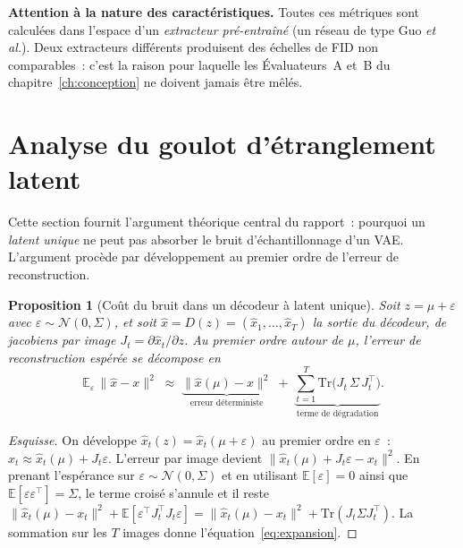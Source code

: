 \documentclass[12pt,a4paper,oneside]{report}
\theoremstyle{definition}
\theoremstyle{plain}
\newtheorem{proposition}{Proposition}[chapter]
\newcommand{\E}{\mathbb{E}}
\newcommand{\Ncal}{\mathcal{N}}
\begin{document}
\begin{encadre}
\textbf{Attention à la nature des caractéristiques.} Toutes ces métriques sont
calculées dans l'espace d'un \emph{extracteur pré-entraîné} (un réseau de type Guo
\emph{et al.}). Deux extracteurs différents produisent des échelles de FID non
comparables~: c'est la raison pour laquelle les Évaluateurs~A et~B du
chapitre~\ref{ch:conception} ne doivent jamais être mêlés.
\end{encadre}

\section{Analyse du goulot d'étranglement latent}
\label{sec:goulot}

Cette section fournit l'argument théorique central du rapport~: pourquoi un
\emph{latent unique} ne peut pas absorber le bruit d'échantillonnage d'un VAE.
L'argument procède par développement au premier ordre de l'erreur de
reconstruction.

\begin{proposition}[Coût du bruit dans un décodeur à latent unique]
\label{prop:jacobien}
Soit $z = \mu + \varepsilon$ avec $\varepsilon\sim\Ncal(0,\Sigma)$, et soit
$\hat x = D(z) = (\hat x_1,\dots,\hat x_T)$ la sortie du décodeur, de jacobiens
par image $J_t = \partial \hat x_t/\partial z$. Au premier ordre autour de $\mu$,
l'erreur de reconstruction espérée se décompose en
\begin{equation}
\E_\varepsilon\,\lVert \hat x - x\rVert^2
\;\approx\;
\underbrace{\lVert \hat x(\mu) - x\rVert^2}_{\text{erreur déterministe}}
\;+\;
\underbrace{\sum_{t=1}^{T}\mathrm{Tr}\!\big(J_t\,\Sigma\,J_t^{\top}\big)}_{\text{terme de dégradation}} .
\label{eq:expansion}
\end{equation}
\end{proposition}

\begin{proof}[Esquisse]
On développe $\hat x_t(z)=\hat x_t(\mu+\varepsilon)$ au premier ordre en
$\varepsilon$~: $\hat x_t \approx \hat x_t(\mu) + J_t\varepsilon$. L'erreur par
image devient $\lVert \hat x_t(\mu) + J_t\varepsilon - x_t\rVert^2$. En prenant
l'espérance sur $\varepsilon\sim\Ncal(0,\Sigma)$ et en utilisant
$\E[\varepsilon]=0$ ainsi que $\E[\varepsilon\varepsilon^\top]=\Sigma$, le terme
croisé s'annule et il reste
$\lVert \hat x_t(\mu)-x_t\rVert^2 + \E[\varepsilon^\top J_t^\top J_t\varepsilon]
= \lVert \hat x_t(\mu)-x_t\rVert^2 + \mathrm{Tr}(J_t\Sigma J_t^\top)$. La sommation
sur les $T$ images donne l'équation~\eqref{eq:expansion}.
\end{proof}
\end{document}
